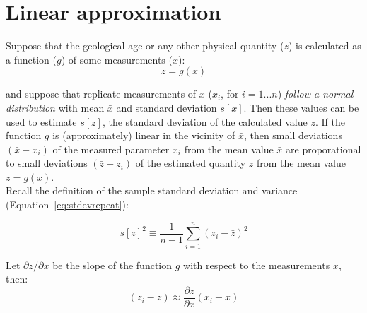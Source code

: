 \section{Linear approximation}
\label{sec:linearerrorprop}

Suppose that the geological age or any other physical quantity ($z$)
is calculated as a function ($g$) of some measurements ($x$):
\begin{equation}
z = g(x)
\label{eq:zgx}
\end{equation}

\noindent and suppose that replicate measurements of $x$ ($x_i$, for
$i=1...n$) \emph{follow a normal distribution} with mean $\bar{x}$ and
standard deviation $s[x]$. Then these values can be used to estimate
$s[z]$, the standard deviation of the calculated value $z$.  If the
function $g$ is (approximately) linear in the vicinity of $\bar{x}$,
then small deviations $(\bar{x}-x_i)$ of the measured parameter $x_i$
from the mean value $\bar{x}$ are proporational to small deviations
$(\bar{z}-z_i)$ of the estimated quantity $z$ from the mean value
$\bar{z}=g(\overline{x})$.\\

Recall the definition of the sample standard deviation and variance
(Equation~\ref{eq:stdevrepeat}):

\begin{equation}
s[z]^2 \equiv \frac{1}{n-1} \sum_{i=1}^{n} (z_i-\bar{z})^2
\label{eq:varz}
\end{equation}

Let $\partial{z}/\partial{x}$ be the slope of the function $g$ with
respect to the measurements $x$, then:
\begin{equation}
(z_i-\bar{z}) \approx \frac{\partial z}{\partial x} (x_i-\bar{x})
\label{eq:zi-z}
\end{equation}

